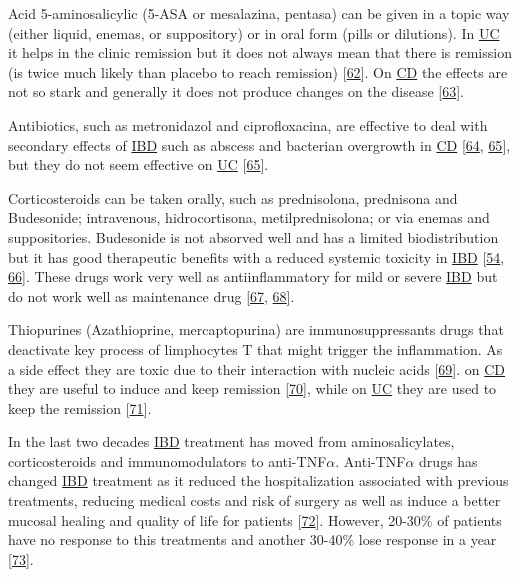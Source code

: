 \documentclass[
  12pt,
  a4paper,
  twoside,
  openright]{book}
\begin{document}
Acid 5-aminosalicylic (5-ASA or mesalazina, pentasa) can be given in a topic way (either liquid, enemas, or suppository) or in oral form (pills or dilutions).
In \protect\hyperlink{acronyms_UC}{UC} it helps in the clinic remission but it does not always mean that there is remission (is twice much likely than placebo to reach remission) {[}\protect\hyperlink{ref-travis2006}{62}{]}.
On \protect\hyperlink{acronyms_CD}{CD} the effects are not so stark and generally it does not produce changes on the disease {[}\protect\hyperlink{ref-akobeng2016}{63}{]}.

Antibiotics, such as metronidazol and ciprofloxacina, are effective to deal with secondary effects of \protect\hyperlink{acronyms_IBD}{IBD} such as abscess and bacterian overgrowth in \protect\hyperlink{acronyms_CD}{CD} {[}\protect\hyperlink{ref-feller2010}{64}, \protect\hyperlink{ref-prantera2009}{65}{]}, but they do not seem effective on \protect\hyperlink{acronyms_UC}{UC} {[}\protect\hyperlink{ref-prantera2009}{65}{]}.

Corticosteroids can be taken orally, such as prednisolona, prednisona and Budesonide; intravenous, hidrocortisona, metilprednisolona; or via enemas and suppositories.
Budesonide is not absorved well and has a limited biodistribution but it has good therapeutic benefits with a reduced systemic toxicity in \protect\hyperlink{acronyms_IBD}{IBD} {[}\protect\hyperlink{ref-peyrin-biroulet2010}{54}, \protect\hyperlink{ref-rezaie2015}{66}{]}.
These drugs work very well as antiinflammatory for mild or severe \protect\hyperlink{acronyms_IBD}{IBD} but do not work well as maintenance drug {[}\protect\hyperlink{ref-lichtenstein2009}{67}, \protect\hyperlink{ref-ouellette2001}{68}{]}.

Thiopurines (Azathioprine, mercaptopurina) are immunosuppressants drugs that deactivate key process of limphocytes T that might trigger the inflammation.
As a side effect they are toxic due to their interaction with nucleic acids {[}\protect\hyperlink{ref-warner2018}{69}{]}.
on \protect\hyperlink{acronyms_CD}{CD} they are useful to induce and keep remission {[}\protect\hyperlink{ref-chande2015}{70}{]}, while on \protect\hyperlink{acronyms_UC}{UC} they are used to keep the remission {[}\protect\hyperlink{ref-gisbert2009}{71}{]}.

In the last two decades \protect\hyperlink{acronyms_IBD}{IBD} treatment has moved from aminosalicylates, corticosteroids and immunomodulators to anti-TNF\(\alpha\).
Anti-TNF\(\alpha\) drugs has changed \protect\hyperlink{acronyms_IBD}{IBD} treatment as it reduced the hospitalization associated with previous treatments, reducing medical costs and risk of surgery as well as induce a better mucosal healing and quality of life for patients {[}\protect\hyperlink{ref-peyrin-biroulet2011}{72}{]}.
However, 20-30\% of patients have no response to this treatments and another 30-40\% lose response in a year {[}\protect\hyperlink{ref-billioud2011}{73}{]}.
\end{document}
